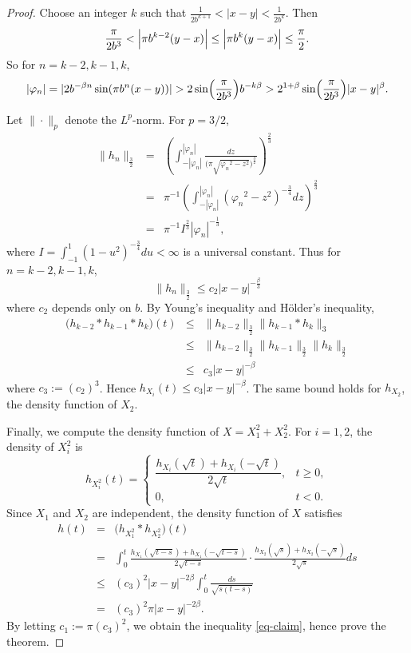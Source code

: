 \documentclass[10pt,a4paper]{amsart}
\begin{document}
\begin{proof}
	Choose an integer \( k \) such that $\frac{1}{2b^{k+1}} < |x-y| < \frac{1}{2b^k}$. 	Then
	\begin{equation*}
		\frac{\pi}{2b^3} < \Bigl|\pi b^{k-2}(y-x)\Bigr|\le \Bigl|\pi b^k(y-x)\Bigr| \le \frac{\pi}{2}.
	\end{equation*}
	So for \( n = k-2,k-1,k \),
	\begin{equation*}
		|\varphi_n|=|2b^{-\beta n}\sin(\pi b^n(x-y))| > 2\sin\Bigl(\frac{\pi}{2b^3}\Bigr) b^{-k\beta}
		> 2^{1+\beta}\sin\Bigl(\frac{\pi}{2b^3}\Bigr) |x-y|^\beta.
	\end{equation*}
	
	Let \( \|\cdot\|_p \) denote the \( L^p \)-norm. For \( p=3/2 \),
	\begin{eqnarray*}
		\|h_n\|_{\frac32}
			&=& \left( \int_{-|\varphi_n|}^{|\varphi_n|} \frac{dz}{\bigl(\pi\sqrt{{\varphi_n}^2-z^2}\bigr)^{\frac32}} \right)^{\frac23} \\
			&=& \pi^{-1} \left( \int_{-|\varphi_n|}^{|\varphi_n|} ({\varphi_n}^2-z^2)^{-\frac34}dz \right)^{\frac23} \\
			&=& \pi^{-1} I^{\frac23} |\varphi_n|^{-\frac13},
	\end{eqnarray*}
	where \( I = \int_{-1}^1 (1-u^2)^{-\frac34}du < \infty \) is a universal constant. Thus for \( n=k-2,k-1,k \),
	\[
	\|h_n\|_{\frac32} \le c_2 |x-y|^{-\frac{\beta}{3}}
	\]
	where \( c_2 \) depends only on \( b \). 	By Young's inequality and H\"older's inequality,
	\begin{eqnarray*}
		\bigl(h_{k-2} * h_{k-1} * h_k\bigr)(t)
			&\le& \|h_{k-2}\|_{\frac32} \|h_{k-1} * h_k\|_3 \\
			&\le&  \|h_{k-2}\|_{\frac32} \|h_{k-1}\|_{\frac32}\|h_k\|_{\frac32} \\
			& \le& c_3 |x-y|^{-\beta}
	\end{eqnarray*} 
	where $c_3 :=(c_2)^3$. Hence $h_{X_i}(t) \le c_3 |x-y|^{-\beta}$. The same bound holds for  $h_{X_2}$, the density function of $X_2$.
	
	Finally, we compute the density function of $X= X_1^2 + X_2^2$. For \( i=1,2 \), the density of \( X_i^2 \) is
	\begin{equation*}
		h_{X_i^2}(t) =
		\begin{cases}
			\dfrac{h_{X_i}(\sqrt{t})+h_{X_i}(-\sqrt{t})}{2\sqrt{t}}, & t\ge 0, \\
			0, & t<0.
		\end{cases}
	\end{equation*}
	Since \( X_1 \) and \( X_2 \) are independent, the density function of \( X \) satisfies
	\begin{eqnarray*}
			h(t) &=& \bigl(h_{X_1^2} * h_{X_2^2}\bigr)(t) \\
			&=& \int_0^t \frac{h_{X_1}(\sqrt{t-s})+h_{X_1}(-\sqrt{t-s})}{2\sqrt{t-s}}
			\cdot \frac{h_{X_2}(\sqrt{s})+h_{X_2}(-\sqrt{s})}{2\sqrt{s}} ds \\
			&\le& ({c_3})^2|x-y|^{-2\beta} \int_0^t \frac{ds}{\sqrt{s(t-s)}} \\
			&=& ({c_3})^2\pi |x-y|^{-2\beta}.
	\end{eqnarray*}
By letting $c_1 :=\pi ({c_3})^2$, we obtain the inequality \eqref{eq-claim}, hence prove the theorem.
\end{proof}
\end{document}
